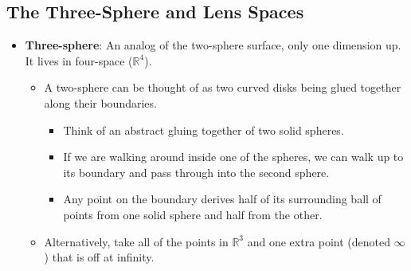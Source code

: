\documentclass[titlepage]{article}
\numberwithin{figure}{section}
\numberwithin{table}{section}
\numberwithin{equation}{section}
\begin{document}
\subsection{The Three-Sphere and Lens Spaces}
\begin{itemize}
    \item \textbf{Three-sphere}: An analog of the two-sphere surface, only one dimension up. It lives in four-space ($\mathbb{R}^4$).
    \begin{itemize}
        \item A two-sphere can be thought of as two curved disks being glued together along their boundaries.
        \begin{itemize}
            \item Think of an abstract gluing together of two solid spheres.
            \item If we are walking around inside one of the spheres, we can walk up to its boundary and pass through into the second sphere.
            \item Any point on the boundary derives half of its surrounding ball of points from one solid sphere and half from the other.
        \end{itemize}
        \item Alternatively, take all of the points in $\mathbb{R}^3$ and one extra point (denoted $\infty$) that is off at infinity.
        \begin{figure}[h!]
            \centering
\end{figure}
\end{itemize}
\end{itemize}
\end{document}
